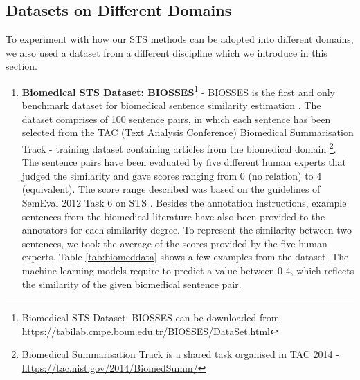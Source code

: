 \subsection{Datasets on Different Domains}
To experiment with how our STS methods can be adopted into different domains, we also used a dataset from a different discipline which we introduce in this section. 
\begin{enumerate}
	
	\item{ \textbf{Biomedical STS Dataset: BIOSSES}\footnote{Biomedical STS Dataset: BIOSSES  can be downloaded from \url{https://tabilab.cmpe.boun.edu.tr/BIOSSES/DataSet.html} }} - BIOSSES is the first and only benchmark dataset for biomedical sentence similarity estimation \autocite{10.1093/bioinformatics/btx238}. The dataset comprises of 100 sentence pairs, in which each sentence has been selected from the TAC (Text Analysis Conference) Biomedical Summarisation Track - training dataset containing articles from the biomedical domain \footnote{Biomedical Summarisation Track is a shared task organised in TAC 2014 - \url{https://tac.nist.gov/2014/BiomedSumm/}}. The sentence pairs have been evaluated by five different human experts that judged the similarity and gave scores ranging from 0 (no relation) to 4 (equivalent). The score range described was based on the guidelines of SemEval 2012 Task 6 on STS \autocite{agirre-etal-2012-semeval}. Besides the annotation instructions, example sentences from the biomedical literature have also been provided to the annotators for each similarity degree. To represent the similarity between two sentences, we took the average of the scores provided by the five human experts. Table \ref{tab:biomeddata} shows a few examples from the dataset. The machine learning models require to predict a value between 0-4, which reflects the similarity of the given biomedical sentence pair.
	


\end{enumerate}
